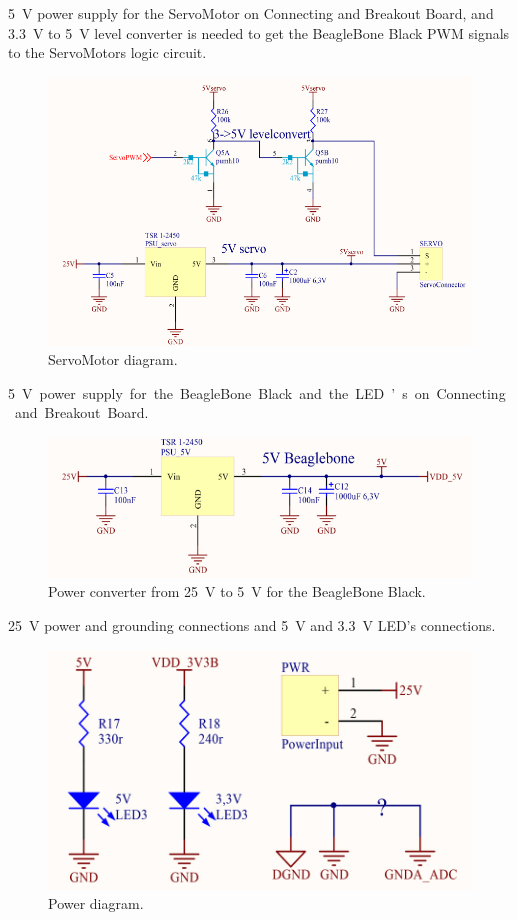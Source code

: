 \SI{5}{V} power supply for the ServoMotor on Connecting and Breakout Board, and \SI{3,3}{V} to \SI{5}{V} level converter is needed to get the BeagleBone Black PWM signals to the ServoMotors logic circuit. 
\begin{figure}[H]
	\centering
	\includegraphics[scale=0.92]{figures/ServoMotor.pdf}
	\caption{ServoMotor diagram.}
	\label{labServoMotor}
\end{figure}\vspace{-5mm}

\SI{5}V power supply for the BeagleBone Black and the LED’s on Connecting and Breakout Board.
\begin{figure}[H]
	\centering
	\includegraphics[scale=0.92]{figures/BeagleBone.pdf}
	\caption{Power converter from \SI{25}{V} to \SI{5}{V} for the BeagleBone Black.}
	\label{labBeagleBone}
\end{figure}\vspace{-5mm}

\SI{25}{V} power and grounding connections and \SI{5}{V} and \SI{3,3}{V} LED's connections.
\begin{figure}[H]
	\centering
	\includegraphics[scale=0.92]{figures/Power.pdf}
	\caption{Power diagram.}
	\label{labPower}
\end{figure}\vspace{-5mm}

